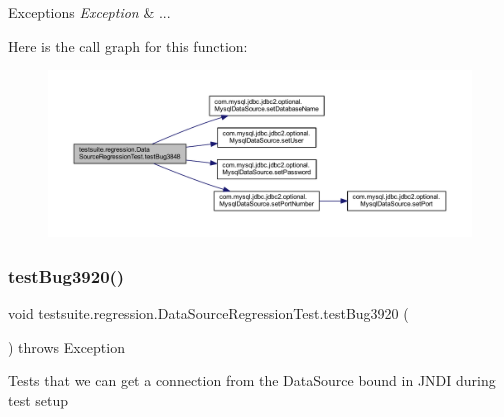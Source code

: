 \begin{DoxyExceptions}{Exceptions}
{\em Exception} & ... \\
\hline
\end{DoxyExceptions}
Here is the call graph for this function\+:
\nopagebreak
\begin{figure}[H]
\begin{center}
\leavevmode
\includegraphics[width=350pt]{classtestsuite_1_1regression_1_1_data_source_regression_test_a8996aec86e7e81696fa451b9d9b457f2_cgraph}
\end{center}
\end{figure}
\mbox{\label{classtestsuite_1_1regression_1_1_data_source_regression_test_ac91c1a6dd9a345d051941b69a3193e57}} 
\subsubsection{\texorpdfstring{test\+Bug3920()}{testBug3920()}}
{\footnotesize\ttfamily void testsuite.\+regression.\+Data\+Source\+Regression\+Test.\+test\+Bug3920 (\begin{DoxyParamCaption}{ }\end{DoxyParamCaption}) throws Exception}

Tests that we can get a connection from the Data\+Source bound in J\+N\+DI during test setup


